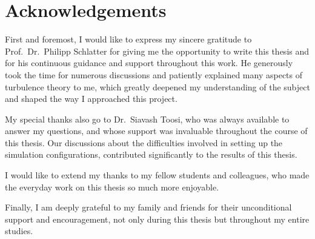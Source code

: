 
\chapter*{Acknowledgements}

First and foremost, I would like to express my sincere gratitude to Prof.\ Dr.\ Philipp Schlatter for giving me the opportunity to write this thesis and for his continuous guidance and support throughout this work. He generously took the time for numerous discussions and patiently explained many aspects of turbulence theory to me, which greatly deepened my understanding of the subject and shaped the way I approached this project.


My special thanks also go to Dr.~Siavash Toosi, who was always available to answer my questions, and whose support was invaluable throughout the course of this thesis. Our discussions about the difficulties involved in setting up the simulation configurations, contributed significantly to the results of this thesis.

I would like to extend my thanks to my fellow students and colleagues, who made the everyday work on this thesis so much more enjoyable.

Finally, I am deeply grateful to my family and friends for their unconditional support and encouragement, not only during this thesis but throughout my entire studies.




